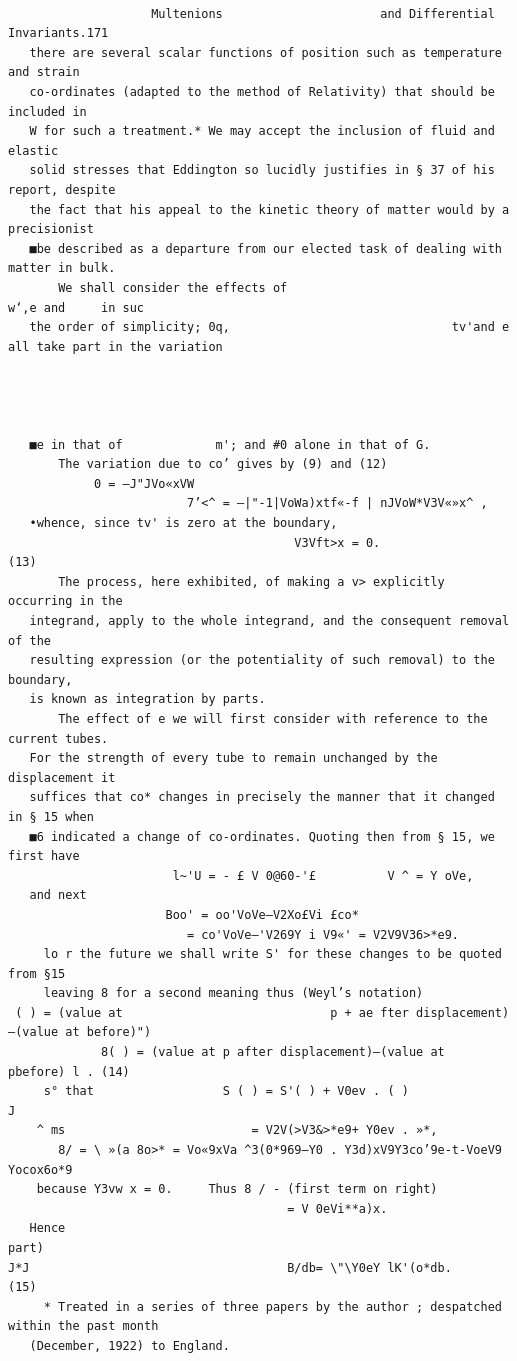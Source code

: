 \documentclass[10pt]{article}
\begin{document}
\clearpage
\begin{verbatim}

                    Multenions                      and Differential Invariants.171
   there are several scalar functions of position such as temperature and strain
   co-ordinates (adapted to the method of Relativity) that should be included in
   W for such a treatment.* We may accept the inclusion of fluid and elastic
   solid stresses that Eddington so lucidly justifies in § 37 of his report, despite
   the fact that his appeal to the kinetic theory of matter would by a precisionist
   ■be described as a departure from our elected task of dealing with matter in bulk.
       We shall consider the effects of                                          w‘,e and     in suc
   the order of simplicity; 0q,                               tv'and e all take part in the variation




   ■e in that of             m'; and #0 alone in that of G.
       The variation due to co’ gives by (9) and (12)
            0 = —J"JVo«xVW
                         7’<^ = —|"-1|VoWa)xtf«-f | nJVoW*V3V«»x^ ,
   •whence, since tv' is zero at the boundary,
                                        V3Vft>x = 0.                                   (13)
       The process, here exhibited, of making a v> explicitly occurring in the
   integrand, apply to the whole integrand, and the consequent removal of the
   resulting expression (or the potentiality of such removal) to the boundary,
   is known as integration by parts.
       The effect of e we will first consider with reference to the current tubes.
   For the strength of every tube to remain unchanged by the displacement it
   suffices that co* changes in precisely the manner that it changed in § 15 when
   ■6 indicated a change of co-ordinates. Quoting then from § 15, we first have
                       l~'U = - £ V 0@60-'£          V ^ = Y oVe,
   and next
                      Boo' = oo'VoVe—V2Xo£Vi £co*
                         = co'VoVe—'V269Y i V9«' = V2V9V36>*e9.
     lo r the future we shall write S' for these changes to be quoted from §15
     leaving 8 for a second meaning thus (Weyl’s notation)
 ( ) = (value at                             p + ae fter displacement)—(value at before)")
             8( ) = (value at p after displacement)—(value at             pbefore) l . (14)
     s° that                  S ( ) = S'( ) + V0ev . ( )                       J
    ^ ms                          = V2V(>V3&>*e9+ Y0ev . »*,
       8/ = \ »(a 8o>* = Vo«9xVa ^3(0*969—Y0 . Y3d)xV9Y3co’9e-t-VoeV9 Yocox6o*9
    because Y3vw x = 0.     Thus 8 / - (first term on right)
                                       = V 0eVi**a)x.
   Hence
part)                                                                        J*J                                    B/db= \"\Y0eY lK'(o*db.                     (15)
     * Treated in a series of three papers by the author ; despatched within the past month
   (December, 1922) to England.


\end{verbatim}
\end{document}
